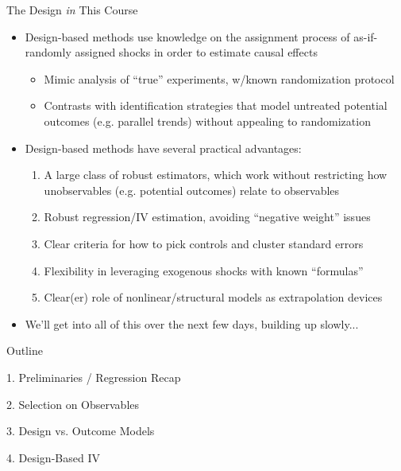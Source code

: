 \documentclass[11pt,english]{beamer}
\begin{document}
\begin{frame}{The Design \emph{in} This Course}

\begin{itemize}
\item Design-based methods use knowledge on the assignment process of as-if-randomly assigned shocks in order to estimate causal effects \smallskip
\begin{itemize}
\item Mimic analysis of ``true'' experiments, w/known randomization protocol\smallskip
\item Contrasts with identification strategies that model untreated potential outcomes (e.g. parallel trends) without appealing to randomization
\end{itemize}\bigskip\pause{}
\item Design-based methods have several practical advantages:\smallskip\pause{}
\begin{enumerate}
\item A large class of robust estimators, which work without restricting how unobservables (e.g. potential outcomes) relate to observables\smallskip\pause{}
\item Robust regression/IV estimation, avoiding ``negative weight'' issues \smallskip\pause{}
\item Clear criteria for how to pick controls and cluster standard errors\smallskip\pause{}
\item Flexibility in leveraging exogenous shocks with known ``formulas''\smallskip\pause{}
\item Clear(er) role of nonlinear/structural models as extrapolation devices
\end{enumerate}\bigskip\pause{}
\item We'll get into all of this over the next few days, building up slowly...
\end{itemize}

\end{frame}

\begin{frame}{Outline}

1. Preliminaries / Regression Recap
\vspace{0.8cm}

2. Selection on Observables
\vspace{0.8cm}

3. Design vs. Outcome Models
\vspace{0.8cm}

4. Design-Based IV

\end{frame}
\end{document}
